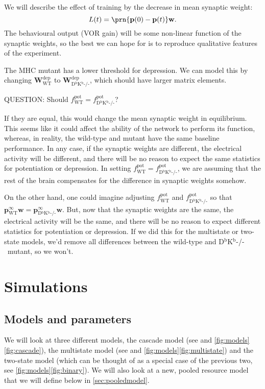 \documentclass[12pt]{article}
\newcommand{\pr}{\mathbf{p}}
\newcommand{\eq}{\pr^\infty}
\newcommand{\w}{\mathbf{w}}
\newcommand{\W}{\mathbf{W}}
\newcommand{\pot}{^{\text{pot}}}
\newcommand{\dep}{^{\text{dep}}}
\newcommand{\wt}{_{\text{WT}}}
\newcommand{\ko}{_{\text{D$^\mathrm{b}$K$^\mathrm{b}$-/-}}}
\newcommand{\KO}{D$^\mathrm{b}$K$^\mathrm{b}$-/-}
\begin{document}
We will describe the effect of training by the decrease in mean synaptic weight:
%
\begin{equation}\label{eq:learning}
  L(t) = \prn{\pr(0)-\pr(t)}\w.
\end{equation}
%
The behavioural output (VOR gain) will be some non-linear function of the synaptic weights, so the best we can hope for is to reproduce qualitative features of the experiment.

The MHC mutant has a lower threshold for depression.
We can model this by changing $\W\dep\wt$ to $\W\dep\ko$, which should have larger matrix elements.

QUESTION: Should $f\pot\wt=f\pot\ko$?

If they are equal, this would change the mean synaptic weight in equilibrium.
This seems like it could affect the ability of the network to perform its function, whereas, in reality, the wild-type and mutant have the same baseline performance.
In any case, if the synaptic weights are different, the electrical activity will be different, and there will be no reason to expect the same statistics for potentiation or depression.
In setting $f\pot\wt=f\pot\ko$, we are assuming that the rest of the brain compensates for the difference in synaptic weights somehow.

On the other hand, one could imagine adjusting $f\pot\wt$ and $f\pot\ko$ so that $\eq\wt\w = \eq\ko\w$.
But, now that the synaptic weights are the same, the electrical activity will be the same, and there will be no reason to expect different statistics for potentiation or depression.
If we did this for the multistate or two-state models, we'd remove all differences between the wild-type and \KO\ mutant, so we won't.


\section{Simulations}\label{sec:sims}

\subsection{Models and parameters}

We will look at three different models, the cascade model (see \cite{Fusi2005cascade} and \autoref{fig:models}\ref{fig:cascade}), the multistate model (see \cite{amit1994learning,Fusi2007multistate} and \autoref{fig:models}\ref{fig:multistate}) and the two-state model (which can be thought of as a special case of the previous two, see \autoref{fig:models}\ref{fig:binary}).
We will also look at a new, pooled resource model that we will define below in \autoref{sec:pooledmodel}.
\end{document}
